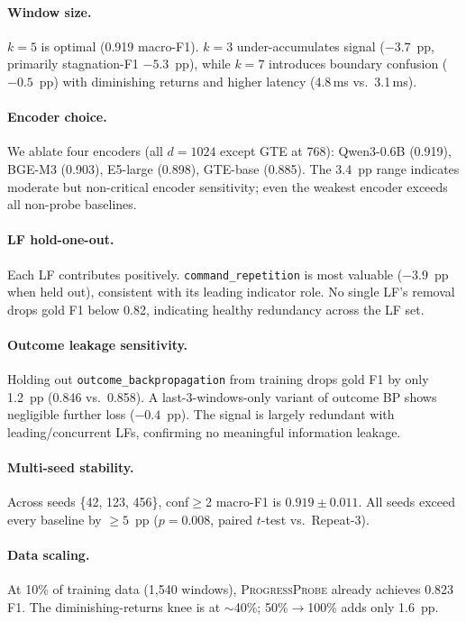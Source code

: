 \documentclass[11pt,a4paper]{article}
\newcommand{\ours}{\textsc{ProgressProbe}}
\begin{document}
\paragraph{Window size.}
$k{=}5$ is optimal (0.919 macro-F1). $k{=}3$ under-accumulates signal ($-3.7$~pp, primarily stagnation-F1 $-5.3$~pp), while $k{=}7$ introduces boundary confusion ($-0.5$~pp) with diminishing returns and higher latency (4.8\,ms vs.\ 3.1\,ms).

\paragraph{Encoder choice.}
We ablate four encoders (all $d{=}1024$ except GTE at 768): Qwen3-0.6B (0.919), BGE-M3 (0.903), E5-large (0.898), GTE-base (0.885). The 3.4~pp range indicates moderate but non-critical encoder sensitivity; even the weakest encoder exceeds all non-probe baselines.

\paragraph{LF hold-one-out.}
Each LF contributes positively. \texttt{command\_repetition} is most valuable ($-3.9$~pp when held out), consistent with its leading indicator role. No single LF's removal drops gold F1 below 0.82, indicating healthy redundancy across the LF set.

\paragraph{Outcome leakage sensitivity.}
Holding out \texttt{outcome\_backpropagation} from training drops gold F1 by only 1.2~pp (0.846 vs.\ 0.858). A last-3-windows-only variant of outcome BP shows negligible further loss ($-0.4$~pp). The signal is largely redundant with leading/concurrent LFs, confirming no meaningful information leakage.

\paragraph{Multi-seed stability.}
Across seeds \{42, 123, 456\}, conf$\geq$2 macro-F1 is $0.919 \pm 0.011$. All seeds exceed every baseline by $\geq 5$~pp ($p{=}0.008$, paired $t$-test vs.\ Repeat-3).

\paragraph{Data scaling.}
At 10\% of training data (1{,}540 windows), \ours{} already achieves 0.823 F1. The diminishing-returns knee is at ${\sim}$40\%; 50\%$\to$100\% adds only 1.6~pp.
\end{document}
